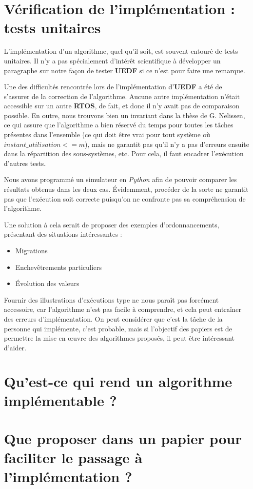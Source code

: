 \section{Vérification de l'implémentation : tests unitaires}


L'implémentation d'un algorithme, quel qu'il soit, est souvent entouré de tests unitaires. 
Il n'y a pas spécialement d'intérêt scientifique à développer un paragraphe sur 
notre façon de tester \textbf{UEDF} si ce n'est pour faire une remarque.\newline

Une des difficultés rencontrée lors de l'implémentation d'\textbf{UEDF} a été de s'assurer de la correction de l'algorithme. 
Aucune autre implémentation n'était accessible sur un autre \textbf{RTOS}, de fait, et donc il n'y avait pas de 
comparaison possible. En outre, nous trouvons bien un invariant dans la thèse de G. Nelissen, ce qui assure 
que l'algorithme a bien réservé du temps pour toutes les tâches présentes dans l'ensemble 
(ce qui doit être vrai pour tout système où $instant\_utilisation <= m$), mais ne garantit pas 
qu'il n'y a pas d'erreurs ensuite dans la répartition des sous-systèmes, etc. Pour cela, il faut encadrer 
l'exécution d'autres tests. \newline

Nous avons programmé un simulateur en \textit{Python} afin de pouvoir comparer les résultats 
obtenus dans les deux cas. Évidemment, procéder de la sorte ne garantit pas que l'exécution soit correcte
puisqu'on ne confronte pas sa compréhension de l'algorithme. \newline

Une solution à cela serait de proposer des exemples d'ordonnancements, présentant des situations intéressantes :
\begin{itemize}
	\setlength\itemsep{0.1em}
	\item Migrations
	\item Enchevêtrements particuliers
	\item Évolution des valeurs
\end{itemize}
Fournir des illustrations d'exécutions type ne nous paraît pas forcément accessoire, car l'algorithme n'est pas facile à comprendre, 
et cela peut entraîner des erreurs d'implémentation. On peut considérer que c'est la tâche de la personne qui implémente, 
c'est probable, mais si l'objectif des papiers est de permettre la mise en œuvre des algorithmes proposés, 
il peut être intéressant d'aider. 


\section{Qu'est-ce qui rend un algorithme implémentable ?}

\section{Que proposer dans un papier pour faciliter le passage à l'implémentation ?}

